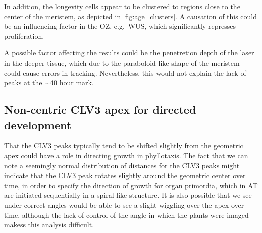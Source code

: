 In addition, the longevity cells appear to be clustered to regions close to the
center of the meristem, as depicted in \cref{fig:age_clusters}. A causation of this
could be an influencing factor in the OZ, e.g.\ WUS, which significantly
represses proliferation. 

A possible factor affecting the results could be the penetretion depth of the
laser in the deeper tissue, which due to the paraboloid-like shape of the
meristem could cause errors in tracking. Nevertheless, this would not explain
the lack of peaks at the $\sim$40 hour mark. 

\subsection{Non-centric CLV3 apex for directed development}
That the CLV3 peaks typically tend to be shifted slightly from the geometric
apex could have a role in directing growth in phyllotaxis. The fact that we
can note a seemingly normal distribution of distances for the CLV3 peaks might
indicate that the CLV3 peak rotates slightly around the geometric center over
time, in order to specify the direction of growth for organ primordia, which in
AT are initiated sequentially in a spiral-like structure. 
It is also possible that we see under correct angles would be able to see a
slight wiggling over the apex over time, although the lack of control of the
angle in which the plants were imaged makess this analysis difficult.  

